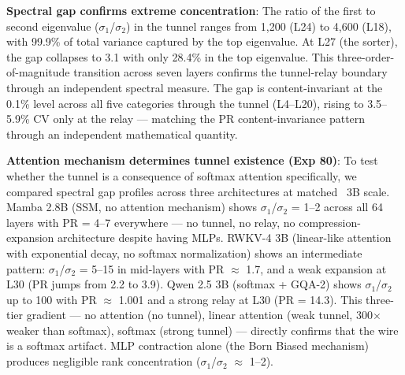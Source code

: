 \documentclass[11pt]{article}
\begin{document}
\textbf{Spectral gap confirms extreme concentration}: The ratio of the first to second eigenvalue ($\sigma$$_1$/$\sigma$$_2$) in the tunnel ranges from 1,200 (L24) to 4,600 (L18), with 99.9\% of total variance captured by the top eigenvalue. At L27 (the sorter), the gap collapses to 3.1 with only 28.4\% in the top eigenvalue. This three-order-of-magnitude transition across seven layers confirms the tunnel-relay boundary through an independent spectral measure. The gap is content-invariant at the 0.1\% level across all five categories through the tunnel (L4–L20), rising to 3.5–5.9\% CV only at the relay --- matching the PR content-invariance pattern through an independent mathematical quantity.

\textbf{Attention mechanism determines tunnel existence (Exp 80)}: To test whether the tunnel is a consequence of softmax attention specifically, we compared spectral gap profiles across three architectures at matched ~3B scale. Mamba 2.8B (SSM, no attention mechanism) shows $\sigma$$_1$/$\sigma$$_2$ = 1–2 across all 64 layers with PR = 4–7 everywhere --- no tunnel, no relay, no compression-expansion architecture despite having MLPs. RWKV-4 3B (linear-like attention with exponential decay, no softmax normalization) shows an intermediate pattern: $\sigma$$_1$/$\sigma$$_2$ = 5–15 in mid-layers with PR $\approx$ 1.7, and a weak expansion at L30 (PR jumps from 2.2 to 3.9). Qwen 2.5 3B (softmax + GQA-2) shows $\sigma$$_1$/$\sigma$$_2$ up to 100 with PR $\approx$ 1.001 and a strong relay at L30 (PR = 14.3). This three-tier gradient --- no attention (no tunnel), linear attention (weak tunnel, 300$\times$ weaker than softmax), softmax (strong tunnel) --- directly confirms that the wire is a softmax artifact. MLP contraction alone (the Born Biased mechanism) produces negligible rank concentration ($\sigma$$_1$/$\sigma$$_2$ $\approx$ 1–2).
\end{document}
